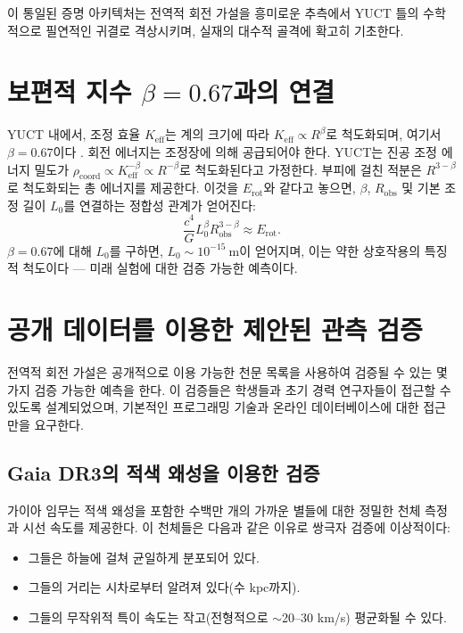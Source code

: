 \documentclass[11pt,a4paper]{article}
\newcommand{\Keff}{K_{\mathrm{eff}}}
\begin{document}
	이 통일된 증명 아키텍처는 전역적 회전 가설을 흥미로운 추측에서 YUCT 틀의 수학적으로 필연적인 귀결로 격상시키며, 실재의 대수적 골격에 확고히 기초한다.
	
	\section{보편적 지수 \(\beta = 0.67\)과의 연결}
	
	YUCT 내에서, 조정 효율 \(\Keff\)는 계의 크기에 따라 \(\Keff \propto R^{\beta}\)로 척도화되며, 여기서 \(\beta = 0.67\)이다 \cite{AppendixL}. 회전 에너지는 조정장에 의해 공급되어야 한다. YUCT는 진공 조정 에너지 밀도가 \(\rho_{\text{coord}} \propto \Keff^{-\beta} \propto R^{-\beta}\)로 척도화된다고 가정한다. 부피에 걸친 적분은 \(R^{3-\beta}\)로 척도화되는 총 에너지를 제공한다. 이것을 \(E_{\text{rot}}\)와 같다고 놓으면, \(\beta\), \(R_{\text{obs}}\) 및 기본 조정 길이 \(L_0\)를 연결하는 정합성 관계가 얻어진다:
	\begin{equation}
		\frac{c^4}{G} L_0^{\beta} R_{\text{obs}}^{3-\beta} \approx E_{\text{rot}}.
	\end{equation}
	\(\beta = 0.67\)에 대해 \(L_0\)를 구하면, \(L_0 \sim 10^{-15}\ \text{m}\)이 얻어지며, 이는 약한 상호작용의 특징적 척도이다 — 미래 실험에 대한 검증 가능한 예측이다.
	
	\section{공개 데이터를 이용한 제안된 관측 검증}
	
	전역적 회전 가설은 공개적으로 이용 가능한 천문 목록을 사용하여 검증될 수 있는 몇 가지 검증 가능한 예측을 한다. 이 검증들은 학생들과 초기 경력 연구자들이 접근할 수 있도록 설계되었으며, 기본적인 프로그래밍 기술과 온라인 데이터베이스에 대한 접근만을 요구한다.
	
	\subsection{Gaia DR3의 적색 왜성을 이용한 검증}
	
	가이아 임무는 적색 왜성을 포함한 수백만 개의 가까운 별들에 대한 정밀한 천체 측정과 시선 속도를 제공한다. 이 천체들은 다음과 같은 이유로 쌍극자 검증에 이상적이다:
	\begin{itemize}
		\item 그들은 하늘에 걸쳐 균일하게 분포되어 있다.
		\item 그들의 거리는 시차로부터 알려져 있다(수 kpc까지).
		\item 그들의 무작위적 특이 속도는 작고(전형적으로 \(\sim\)20–30 km/s) 평균화될 수 있다.
	\end{itemize}
	
\end{document}
